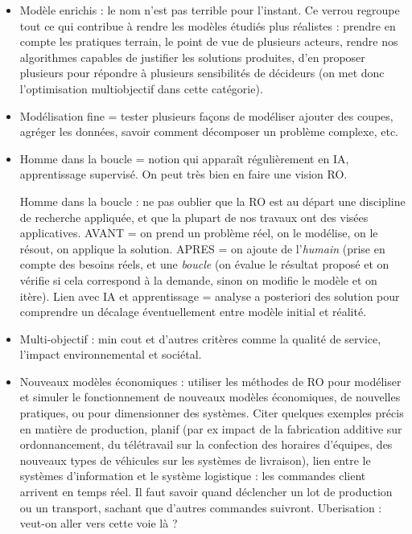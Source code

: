 	
	\begin{itemize}
		\item Modèle enrichis : le nom n'est pas terrible pour l'instant. Ce verrou regroupe tout ce qui contribue à rendre les modèles étudiés plus réalistes : prendre en compte les pratiques terrain, le point de vue de plusieurs acteurs, rendre nos algorithmes capables de justifier les solutions produites, d'en proposer plusieurs pour répondre à plusieurs sensibilités de décideurs (on met donc l'optimisation multiobjectif dans cette catégorie).
		
		\item Modélisation fine = tester plusieurs façons de modéliser ajouter des coupes, agréger les données, savoir comment décomposer un problème complexe, etc.
	
	\item 	Homme dans la boucle = notion qui apparaît régulièrement en IA, apprentissage supervisé. On peut très bien en faire une vision RO. 
	
	Homme dans la boucle : ne pas oublier que la RO est au départ une discipline de recherche appliquée, et que la plupart de nos travaux ont des visées applicatives. AVANT = on prend un problème réel, on le modélise, on le résout, on applique la solution. APRES = on ajoute de l'\textit{humain} (prise en compte des besoins réels, et une \textit{boucle} (on évalue le résultat proposé et on vérifie si cela correspond à la demande, sinon on modifie le modèle et on itère). Lien avec IA et apprentissage = analyse a posteriori des solution pour comprendre un décalage éventuellement entre modèle initial et réalité. 
	
	\item Multi-objectif : min cout et d'autres critères comme la qualité de service, l'impact environnemental et sociétal. 
	
	\item Nouveaux modèles économiques : utiliser les méthodes de RO pour modéliser et simuler le fonctionnement de nouveaux modèles économiques, de nouvelles pratiques, ou pour dimensionner des systèmes. 
	Citer quelques exemples précis en matière de production, planif (par ex impact de la fabrication additive sur ordonnancement, du télétravail sur la confection des horaires d'équipes, des nouveaux types de véhicules sur les systèmes de livraison), lien entre le systèmes d'information et le système logistique : les commandes client arrivent en temps réel. Il faut savoir quand déclencher un lot de production ou un transport, sachant que d'autres commandes suivront. Uberisation : veut-on aller vers cette voie là ? 
	
		\end{itemize}

